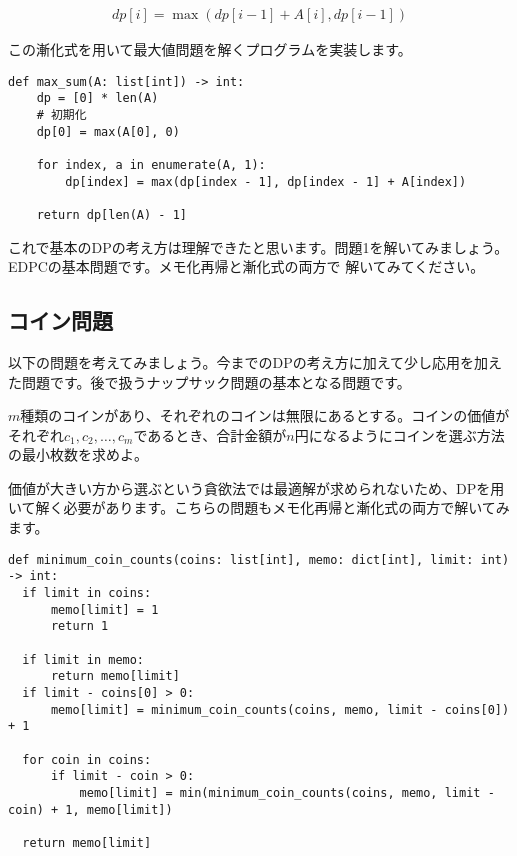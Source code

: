 \begin{align*}
  dp[i] = \max(dp[i-1] + A[i], dp[i-1])
\end{align*}

この漸化式を用いて最大値問題を解くプログラムを実装します。

\begin{lstlisting}[caption=漸化式を用いた最大値問題の実装, frame=TRBL, label={dp_max}]
def max_sum(A: list[int]) -> int:
    dp = [0] * len(A)
    # 初期化
    dp[0] = max(A[0], 0)
    
    for index, a in enumerate(A, 1):
        dp[index] = max(dp[index - 1], dp[index - 1] + A[index])
    
    return dp[len(A) - 1]
\end{lstlisting}

これで基本のDPの考え方は理解できたと思います。問題1を解いてみましょう。EDPCの基本問題です。メモ化再帰と漸化式の両方で
解いてみてください。

\subsection{コイン問題}
以下の問題を考えてみましょう。今までのDPの考え方に加えて少し応用を加えた問題です。後で扱うナップサック問題の基本となる問題です。

\begin{problem}
  $m$種類のコインがあり、それぞれのコインは無限にあるとする。コインの価値がそれぞれ$c_1, c_2, \ldots, c_m$であるとき、合計金額が$n$円になるようにコインを選ぶ方法の最小枚数を求めよ。
\end{problem}

価値が大きい方から選ぶという貪欲法では最適解が求められないため、DPを用いて解く必要があります。こちらの問題もメモ化再帰と漸化式の両方で解いてみます。

\begin{lstlisting}[caption=メモ化再帰を用いたコイン問題の実装, frame=TRBL, label={memo_coin}]
def minimum_coin_counts(coins: list[int], memo: dict[int], limit: int) -> int:
  if limit in coins:
      memo[limit] = 1
      return 1
  
  if limit in memo:
      return memo[limit]
  if limit - coins[0] > 0:
      memo[limit] = minimum_coin_counts(coins, memo, limit - coins[0]) + 1    
  
  for coin in coins:
      if limit - coin > 0:
          memo[limit] = min(minimum_coin_counts(coins, memo, limit - coin) + 1, memo[limit])

  return memo[limit]
\end{lstlisting}

